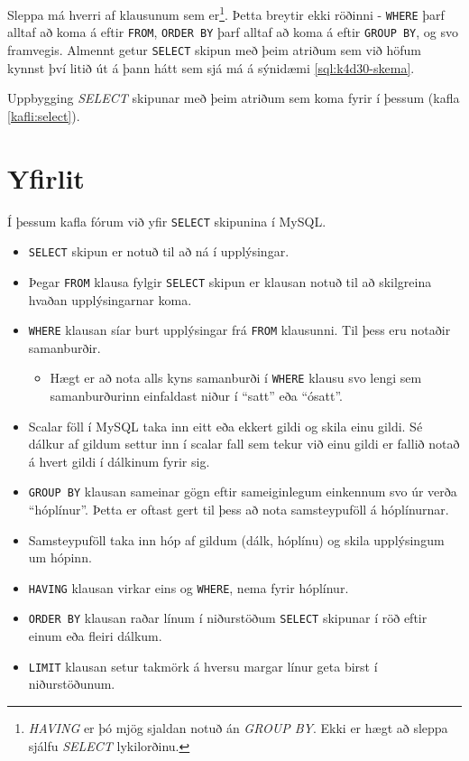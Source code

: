 Sleppa má hverri af klausunum sem er\footnote{\emph{HAVING} er þó mjög sjaldan notuð án \emph{GROUP BY}. Ekki er hægt að sleppa sjálfu \emph{SELECT} lykilorðinu.}. Þetta breytir ekki röðinni - \verb|WHERE| þarf alltaf að koma á eftir \verb|FROM|, \verb|ORDER BY| þarf alltaf að koma á eftir \verb|GROUP BY|, og svo framvegis. Almennt getur \verb|SELECT| skipun með þeim atriðum sem við höfum kynnst því litið út á þann hátt sem sjá má á sýnidæmi \ref{sql:k4d30-skema}.

\begin{example}
\caption[Uppbygging]{Uppbygging \emph{SELECT} skipunar með þeim atriðum sem koma fyrir í þessum (kafla \ref{kafli:select}).}
\label{sql:k4d30-skema}
\centering
{}
\end{example}


\section{Yfirlit}
Í þessum kafla fórum við yfir \verb|SELECT| skipunina í MySQL.
\begin{itemize}
 \item \verb|SELECT| skipun er notuð til að ná í upplýsingar.
 \item Þegar \verb|FROM| klausa fylgir \verb|SELECT| skipun er klausan notuð til að skilgreina hvaðan upplýsingarnar koma. 
 \item \verb|WHERE| klausan síar burt upplýsingar frá \verb|FROM| klausunni. Til þess eru notaðir samanburðir.
 \begin{itemize}
  \item Hægt er að nota alls kyns samanburði í \verb|WHERE| klausu svo lengi sem samanburðurinn einfaldast niður í ``satt'' eða ``ósatt''.
 \end{itemize}
 \item Scalar föll í MySQL taka inn eitt eða ekkert gildi og skila einu gildi. Sé dálkur af gildum settur inn í scalar fall sem tekur við einu gildi er fallið notað á hvert gildi í dálkinum fyrir sig.
 \item \verb|GROUP BY| klausan sameinar gögn eftir sameiginlegum einkennum svo úr verða ``hóplínur''. Þetta er oftast gert til þess að nota samsteypuföll á hóplínurnar.
 \item Samsteypuföll taka inn hóp af gildum (dálk, hóplínu) og skila upplýsingum um hópinn.
 \item \verb|HAVING| klausan virkar eins og \verb|WHERE|, nema fyrir hóplínur.
 \item \verb|ORDER BY| klausan raðar línum í niðurstöðum \verb|SELECT| skipunar í röð eftir einum eða fleiri dálkum.
 \item \verb|LIMIT| klausan setur takmörk á hversu margar línur geta birst í niðurstöðunum.
\end{itemize}
